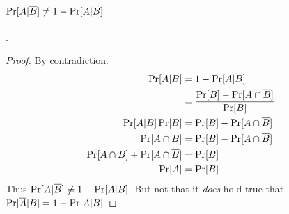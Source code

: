 \paragraph{$\operatorname{Pr}[A|\overline{B}] \neq 1 - \operatorname{Pr}[A | B]$}. 
\begin{proof}
    By contradiction. 
    \begin{equation}
        \begin{aligned}
           \operatorname{Pr}[A|B]                 &= 1 - \operatorname{Pr}[A | \overline{B}] \\
                                           &= \frac{  \operatorname{Pr}[B] - \operatorname{Pr}[A \cap \overline{B}]  }{  \operatorname{Pr}[B]  }  \\
           \operatorname{Pr}[A|B] \operatorname{Pr}[B]   &=         \operatorname{Pr}[B] - \operatorname{Pr}[A \cap \overline{B}] \\
           \operatorname{Pr}[A \cap B]   &= \operatorname{Pr}[B] - \operatorname{Pr}[A \cap \overline{B}] \\
           \operatorname{Pr}[A \cap B] + \operatorname{Pr}[A \cap \overline{B}]  &= \operatorname{Pr}[B] \\
           \operatorname{Pr}[A] &= \operatorname{Pr}[B]
        \end{aligned}
    \end{equation}
    Thus $\operatorname{Pr}[A|\overline{B}] \neq 1 - \operatorname{Pr}[A | B]$. But not that it \emph{does} hold true that $\operatorname{Pr}[\overline{A}|B] = 1 - \operatorname{Pr}[A | B]$
\end{proof}

